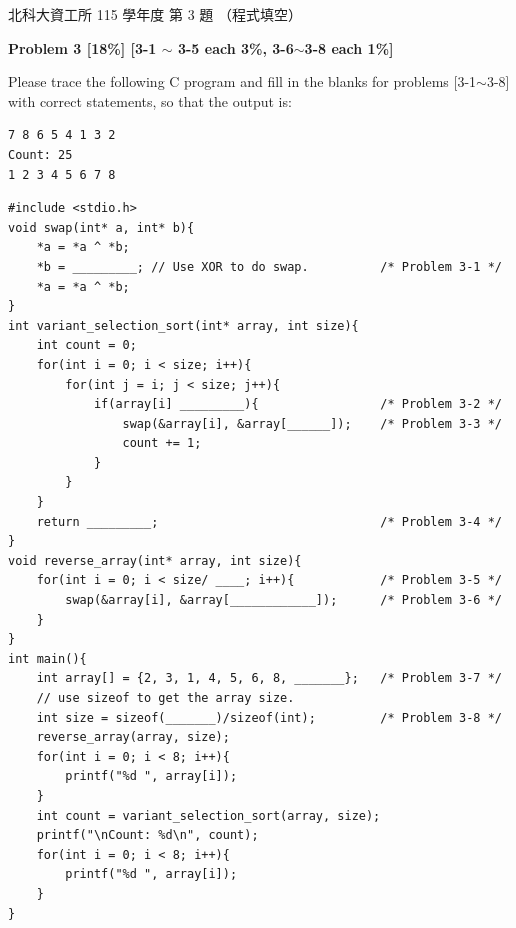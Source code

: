 \begin{pastexam}[label={px:ntut-115-prog-03}]{北科大資工所 115 學年度 第 3 題}
（程式填空）

\textbf{Problem 3 [18\%] [3-1 $\sim$ 3-5 each 3\%, 3-6$\sim$3-8 each 1\%]}

Please trace the following C program and fill in the blanks for problems [3-1$\sim$3-8] with correct statements, so that the output is:
\begin{verbatim}
7 8 6 5 4 1 3 2
Count: 25
1 2 3 4 5 6 7 8
\end{verbatim}
\begin{verbatim}
#include <stdio.h>
void swap(int* a, int* b){
    *a = *a ^ *b;
    *b = _________; // Use XOR to do swap.          /* Problem 3-1 */
    *a = *a ^ *b;
}
int variant_selection_sort(int* array, int size){
    int count = 0;
    for(int i = 0; i < size; i++){
        for(int j = i; j < size; j++){
            if(array[i] _________){                 /* Problem 3-2 */
                swap(&array[i], &array[______]);    /* Problem 3-3 */
                count += 1;
            }
        }
    }
    return _________;                               /* Problem 3-4 */
}
void reverse_array(int* array, int size){
    for(int i = 0; i < size/ ____; i++){            /* Problem 3-5 */
        swap(&array[i], &array[____________]);      /* Problem 3-6 */
    }
}
int main(){
    int array[] = {2, 3, 1, 4, 5, 6, 8, _______};   /* Problem 3-7 */
    // use sizeof to get the array size.
    int size = sizeof(_______)/sizeof(int);         /* Problem 3-8 */
    reverse_array(array, size);
    for(int i = 0; i < 8; i++){
        printf("%d ", array[i]);
    }
    int count = variant_selection_sort(array, size);
    printf("\nCount: %d\n", count);
    for(int i = 0; i < 8; i++){
        printf("%d ", array[i]);
    }
}
\end{verbatim}
\end{pastexam}

